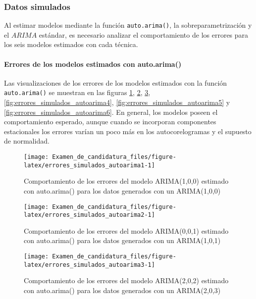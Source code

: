 \documentclass[
]{article}
\begin{document}
\subsubsection{Datos simulados}

Al estimar modelos mediante la función \texttt{auto.arima()}, la
sobreparametrización y el \(ARIMA\) estándar, es necesario analizar el
comportamiento de los errores para los seis modelos estimados con cada
técnica.

\paragraph{Errores de los modelos estimados con auto.arima()}

Las visualizaciones de los errores de los modelos estimados con la
función \texttt{auto.arima()} se muestran en las figuras
\ref{fig:errores_simulados_autoarima1},
\ref{fig:errores_simulados_autoarima2},
\ref{fig:errores_simulados_autoarima3},
\ref{fig:errores_simulados_autoarima4},
\ref{fig:errores_simulados_autoarima5} y
\ref{fig:errores_simulados_autoarima6}. En general, los modelos poseen
el comportamiento esperado, aunque cuando se incorporan componentes
estacionales los errores varían un poco más en los autocorelogramas y el
supuesto de normalidad.

\begin{figure}[H]
\texttt{[image: Examen\_de\_candidatura\_files/figure-latex/errores\_simulados\_autoarima1-1]} \caption{Comportamiento de los errores del modelo ARIMA(1,0,0) estimado con auto.arima() para los datos generados con un ARIMA(1,0,0)}\label{fig:errores_simulados_autoarima1}
\end{figure}

\begin{figure}[H]
\texttt{[image: Examen\_de\_candidatura\_files/figure-latex/errores\_simulados\_autoarima2-1]} \caption{Comportamiento de los errores del modelo ARIMA(0,0,1) estimado con auto.arima() para los datos generados con un ARIMA(1,0,1)}\label{fig:errores_simulados_autoarima2}
\end{figure}

\begin{figure}[H]
\texttt{[image: Examen\_de\_candidatura\_files/figure-latex/errores\_simulados\_autoarima3-1]} \caption{Comportamiento de los errores del modelo ARIMA(2,0,2) estimado con auto.arima() para los datos generados con un ARIMA(2,0,3)}\label{fig:errores_simulados_autoarima3}
\end{figure}
\end{document}

